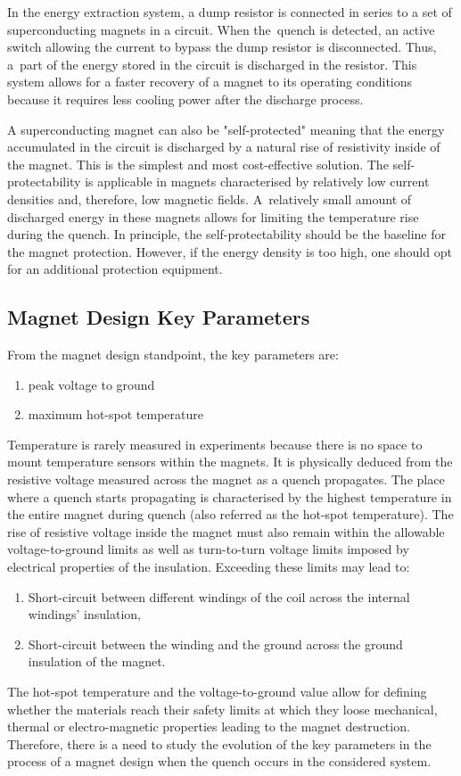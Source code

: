 In the energy extraction system, a dump resistor is connected in series to a set of superconducting magnets in a circuit. When the~quench is detected, an active switch allowing the current to bypass the dump resistor is disconnected.  Thus, a~part of the energy stored in the circuit is discharged in the resistor. This system allows for a faster recovery of a magnet to its operating conditions because it requires less cooling power after the discharge process.~\cite{salmiquenchheateroptimization}

A superconducting magnet can also be "self-protected" meaning that the energy accumulated in the circuit is discharged by a natural rise of resistivity inside of the magnet. This is the simplest and most cost-effective solution. The self-protectability is applicable in magnets characterised by relatively low current densities and, therefore, low magnetic fields. A~relatively small amount of discharged energy in these magnets allows for limiting the temperature rise during the quench. In principle, the self-protectability should be the baseline for the magnet protection. However, if the energy density is too high, one should opt for an additional protection equipment.

\subsection{Magnet Design Key Parameters}

From the magnet design standpoint, the key parameters are:
\begin{enumerate}
    \item peak voltage to ground
    \item maximum hot-spot temperature
\end{enumerate}

Temperature is rarely measured in experiments because there is no space to mount temperature sensors within the magnets. It is physically deduced from the resistive voltage measured across the magnet as a quench propagates. The place where a quench starts propagating is characterised by the highest temperature in the entire magnet during quench (also referred as the hot-spot temperature). The rise of resistive voltage inside the magnet must also remain within the allowable voltage-to-ground limits as well as turn-to-turn voltage limits imposed by electrical properties of the insulation. Exceeding these limits may lead to:

\begin{enumerate}
    \item Short-circuit between different windings of the coil across the internal windings' insulation,
    \item Short-circuit between the winding and the ground across the ground insulation of the magnet.
\end{enumerate}

The hot-spot temperature and the voltage-to-ground value allow for defining whether the materials reach their safety limits at which they loose mechanical, thermal or electro-magnetic properties leading to the magnet destruction. Therefore, there is a need to study the evolution of the key parameters in the process of a magnet design when the quench occurs in the considered system.